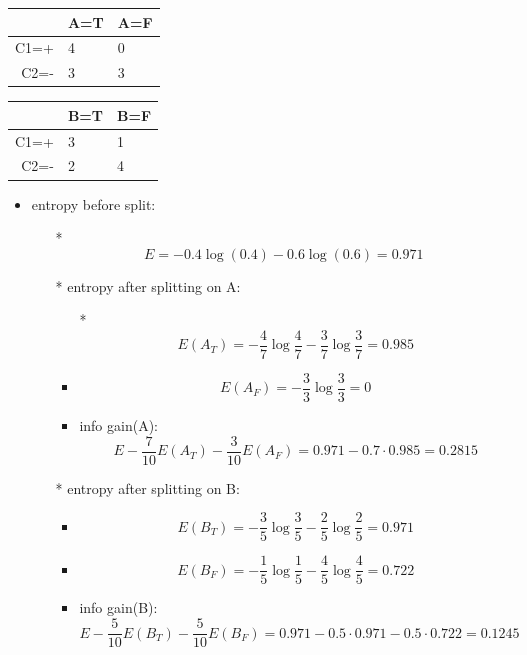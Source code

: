 \documentclass[11pt]{article}
\providecommand{\tightlist}{%
      \setlength{\itemsep}{0pt}\setlength{\parskip}{0pt}}
\begin{document}
\begin{table}[H]
\centering	
\begin{tabular}{|r|l|l|}

  & A=T & A=F \\
\hline
     C1=+ &  4     & 0 \\
     C2=-   &  3    & 3 \\
\end{tabular}
\end{table}


\begin{table}[H]
	\centering
\begin{tabular}{|r|l|l|}
  & B=T & B=F \\
\hline
     C1=+ &  3    & 1 \\
     C2=-   &  2    & 4 \\
\end{tabular}
\end{table}

\begin{itemize}
\tightlist
\item
  entropy before split:

  \begin{itemize}
  \tightlist
  \item[*]
    \[E = -0.4 \log (0.4) - 0.6 \log (0.6) = 0.971\]
  \item[*]
    entropy after splitting on A:

    \begin{itemize}
    \tightlist
    \item[*]
      \[E(A_T) = -\frac{4}{7} \log \frac{4}{7} - \frac{3}{7} \log \frac{3}{7} = 0.985\]
    \item
      \[E(A_F) = - \frac{3}{3} \log \frac{3}{3} = 0 \]
    \item
      info gain(A):
      \[E - \frac{7}{10} E(A_T) - \frac{3}{10} E(A_F) = 0.971 - 0.7 \cdot 0.985 = 0.2815\]
    \end{itemize}
  \item[*]
    entropy after splitting on B:

    \begin{itemize}
    \tightlist
    \item
      \[E(B_T) = -\frac{3}{5} \log \frac{3}{5} - \frac{2}{5} \log \frac{2}{5} = 0.971\]
    \item
      \[E(B_F) = - \frac{1}{5} \log \frac{1}{5} - \frac{4}{5} \log \frac{4}{5} = 0.722\]
    \item
      info gain(B):
      \[E - \frac{5}{10} E(B_T) - \frac{5}{10} E(B_F) = 0.971 - 0.5 \cdot 0.971 - 0.5 \cdot 0.722 = 0.1245\]
    \end{itemize}
  \end{itemize}
\end{itemize}
\end{document}
